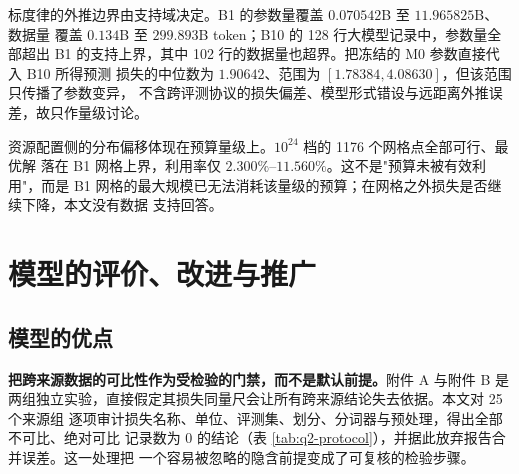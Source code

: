 \documentclass[bwprint]{gmcmthesis}
\numberwithin{equation}{section}
\numberwithin{figure}{section}
\numberwithin{table}{section}
\begin{document}
标度律的外推边界由支持域决定。B1 的参数量覆盖 $0.070542$B 至 $11.965825$B、数据量
覆盖 $0.134$B 至 $299.893$B token；B10 的 128 行大模型记录中，参数量全部超出
B1 的支持上界，其中 102 行的数据量也超界。把冻结的 M0 参数直接代入 B10 所得预测
损失的中位数为 $1.90642$、范围为 $[1.78384,4.08630]$，但该范围只传播了参数变异，
不含跨评测协议的损失偏差、模型形式错设与远距离外推误差，故只作量级讨论。

资源配置侧的分布偏移体现在预算量级上。$10^{24}$ 档的 1176 个网格点全部可行、最优解
落在 B1 网格上界，利用率仅 $2.300\%$--$11.560\%$。这不是"预算未被有效利用"，而是
B1 网格的最大规模已无法消耗该量级的预算；在网格之外损失是否继续下降，本文没有数据
支持回答。



\clearpage
\section{模型的评价、改进与推广}

%

\subsection{模型的优点}

\textbf{把跨来源数据的可比性作为受检验的门禁，而不是默认前提。}附件 A 与附件 B 是
两组独立实验，直接假定其损失同量尺会让所有跨来源结论失去依据。本文对 25 个来源组
逐项审计损失名称、单位、评测集、划分、分词器与预处理，得出全部不可比、绝对可比
记录数为 0 的结论（表 \ref{tab:q2-protocol}），并据此放弃报告合并误差。这一处理把
一个容易被忽略的隐含前提变成了可复核的检验步骤。
\end{document}
